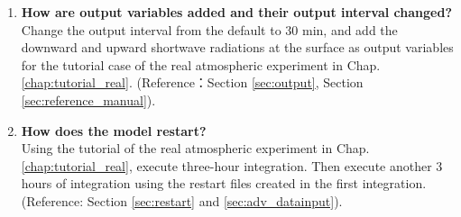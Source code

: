 \begin{enumerate}
\item {\bf How are output variables added and their output interval changed?}\\
Change the output interval from the default to 30 min, and add the downward and upward shortwave radiations at the surface as output variables for the tutorial case of the real atmospheric experiment in Chap. \ref{chap:tutorial_real}. (Reference：Section \ref{sec:output}, Section \ref{sec:reference_manual}).

\item {\bf How does the model restart?}\\
Using the tutorial of the real atmospheric experiment in Chap. \ref{chap:tutorial_real}, execute three-hour integration. Then execute another 3 hours of integration using the restart files created in the first integration.
(Reference: Section \ref{sec:restart} and \ref{sec:adv_datainput}).


\end{enumerate}


